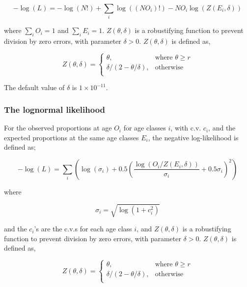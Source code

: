 \begin{equation}
  -\log \left(L \right) =  -\log \left(N! \right) + \sum\limits_i \log \left( \left(NO_i \right)! \right) - NO_i \log \left(Z \left(E_i,\delta \right) \right)
\end{equation}

where $\sum\limits_i O_i = 1$ and $\sum\limits_i E_i = 1$. $Z \left(\theta,\delta \right)$ is a robustifying function to prevent division by zero errors, with parameter $\delta>0$. $Z \left(\theta,\delta \right)$ is defined as,

\begin{equation}
   Z \left(\theta,\delta \right) = \begin{cases}
	  \theta, & \text{where $\theta \ge r$} \\
	  \delta/\left( 2-\theta/\delta \right), & \text{otherwise} \\  
  \end{cases}
\end{equation}

The default value of $\delta$ is $1 \times 10^{-11}$.

\subsubsection*{The lognormal likelihood}

For the observed proportions at age $O_i$ for age classes $i$, with c.v. $c_i$, and the expected proportions at the same age classes $E_i$, the negative log-likelihood is defined as; 

\begin{equation}
 - \log \left(L \right) = \sum\limits_i \left( \log \left( \sigma _i \right) + 0.5\left( \frac{\log \left(O_i / Z \left(E_i,\delta \right) \right)}{\sigma_i} + 0.5 \sigma_i \right)^2 \right)
\end{equation}

where 

\begin{equation}
  \sigma_i  = \sqrt{\log \left(1+c_i^2 \right)}
\end{equation}

and the $c_i$'s are the c.v.s for each age class $i$, and $Z \left(\theta,\delta \right)$ is a robustifying function to prevent division by zero errors, with parameter $\delta>0$. $Z \left(\theta,\delta \right)$ is defined as,

\begin{equation}
   Z \left(\theta,\delta \right) = \begin{cases}
	  \theta, & \text{where $\theta \ge r$} \\
	  \delta/\left( 2-\theta/\delta \right), & \text{otherwise} \\  
  \end{cases}
\end{equation}

